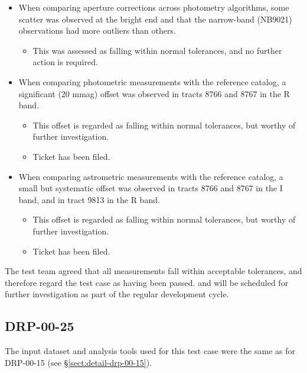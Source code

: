 \documentclass[DM,lsstdraft,STR,toc]{lsstdoc}
\begin{document}
\begin{itemize}

  \item{When comparing aperture corrections across photometry algorithms, some scatter was observed at the bright end and that the narrow-band (NB9021) observations had more outliers than others.
    \begin{itemize}
      \item{This was assessed as falling within normal tolerances, and no further action is required.}
    \end{itemize}
  }

  \item{When comparing photometric measurements with the reference catalog, a significant (20 mmag) offset was observed in tracts 8766 and 8767 in the R band.
    \begin{itemize}
      \item{This offset is regarded as falling within normal tolerances, but worthy of further investigation.}
      \item{Ticket  has been filed.}
    \end{itemize}
  }

  \item{When comparing astrometric measurements with the reference catalog, a small but systematic offset was observed in tracts 8766 and 8767 in the I band, and in tract 9813 in the R band.
    \begin{itemize}
      \item{This offset is regarded as falling within normal tolerances, but worthy of further investigation.}
      \item{Ticket  has been filed.}
    \end{itemize}
  }

\end{itemize}

The test team agreed that all measurements fall within acceptable tolerances, and therefore regard the test case as having been passed.
 and  will be scheduled for further investigation as part of the regular development cycle.

\subsection{DRP-00-25}
\label{sect:detail-drp-00-25}

The input dataset and analysis tools used for this test case were the same as for DRP-00-15 (see \S\ref{sect:detail-drp-00-15}).
\end{document}
